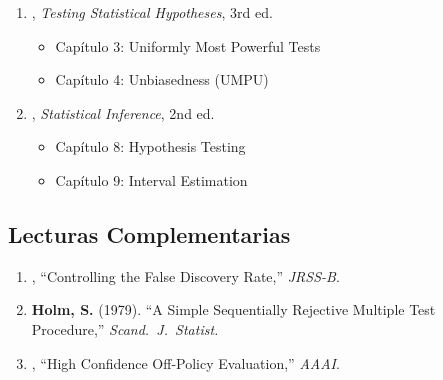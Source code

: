 \begin{enumerate}
	\item \textbf{\citet{lehmann2005testing}}, \emph{Testing Statistical
		      Hypotheses}, 3rd ed.
	      \begin{itemize}
		      \item Capítulo 3: Uniformly Most Powerful Tests
		      \item Capítulo 4: Unbiasedness (UMPU)
	      \end{itemize}

	\item \textbf{\citet{casella2002statistical}}, \emph{Statistical Inference}, 2nd ed.
	      \begin{itemize}
		      \item Capítulo 8: Hypothesis Testing
		      \item Capítulo 9: Interval Estimation
	      \end{itemize}
\end{enumerate}

\subsection*{Lecturas Complementarias}

\begin{enumerate}
	\item \textbf{\citet{benjamini1995controlling}}, ``Controlling the False
	      Discovery Rate,'' \emph{JRSS-B}.

	\item \textbf{Holm, S.} (1979). ``A Simple Sequentially Rejective Multiple
	      Test Procedure,'' \emph{Scand.\ J.\ Statist.}

	\item \textbf{\citet{thomas2015high}}, ``High Confidence Off-Policy
	      Evaluation,'' \emph{AAAI}.
\end{enumerate}

